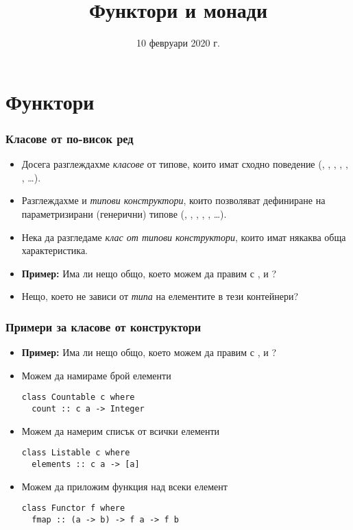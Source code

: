 \documentclass[alsotrans]{beamerswitch}
\title{Функтори и монади}
\date{10 февруари 2020 г.}
\begin{document}
\begin{frame}
  \titlepage
\end{frame}

\section{Функтори}

\begin{frame}[fragile]
  \frametitle{Класове от по-висок ред}

  \begin{itemize}[<+->]
  \item Досега разглеждахме \emph{класове} от типове, които имат
    сходно поведение (, , , ,
    , , \ldots).
  \item
    Разглеждахме и \emph{типови конструктори}, които позволяват дефиниране на параметризирани (генерични) типове (, \lst{[]}, , , , \ldots).
  \item
    Нека да разгледаме \emph{клас от типови конструктори}, които имат някаква обща характеристика.
  \item
    \textbf{Пример:} Има ли нещо общо, което можем да правим с \lst{[]},  и ?
  \item Нещо, което не зависи от \emph{типа} на елементите в тези контейнери?
  \end{itemize}
\end{frame}

\begin{frame}[fragile]
  \frametitle{Примери за класове от конструктори}
  \begin{itemize}[<+->]
  \item
    \textbf{Пример:} Има ли нещо общо, което можем да правим с \lst{[]},  и ?
  \item Можем да намираме брой елементи
\begin{lstlisting}
class Countable c where
  count :: c a -> Integer
\end{lstlisting}
  \item Можем да намерим списък от всички елементи
\begin{lstlisting}
class Listable c where
  elements :: c a -> [a]
\end{lstlisting}
  \item Можем да приложим функция над всеки елемент
\begin{lstlisting}
class Functor f where
  fmap :: (a -> b) -> f a -> f b
\end{lstlisting}
\end{itemize}
\end{frame}
\end{document}
